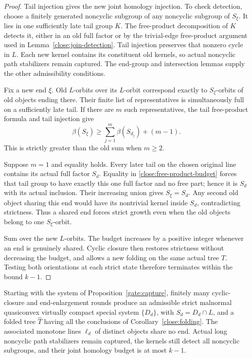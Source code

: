 \begin{proof}
Tail injection gives the new joint homology injection. To check
detection, choose a finitely generated noncyclic subgroup of any
noncyclic subgroup of $S_\xi$. It lies in one sufficiently late
tail group $K$. The free-product decomposition of $K$ detects it,
either in an old full factor or by the trivial-edge free-product
argument used in Lemma~\ref{close:join-detection}. Tail injection
preserves that nonzero cycle in $L$. Each new kernel contains its
constituent old kernels, so actual noncyclic path stabilizers remain
captured. The end-group and intersection lemmas supply the other
admissibility conditions.

Fix a new end $\xi$. Old $L$-orbits over its $L$-orbit correspond
exactly to $S_\xi$-orbits of old objects ending there. Their finite
list of representatives is simultaneously full on a sufficiently
late tail. If there are $m$ such representatives, the tail
free-product formula and tail injection give
\[
 \beta(S_\xi)\ge
   \sum_{j=1}^m\beta(S_{d_j})+(m-1).
\]
This is strictly greater than the old sum when $m\ge2$.

Suppose $m=1$ and equality holds. Every later tail on the chosen
original line contains its actual full factor $S_d$. Equality in
\eqref{close:free-product-budget} forces that tail group to have
exactly this one full factor and no free part; hence it is $S_d$
with its actual inclusion. Their increasing union gives
$S_\xi=S_d$. Any second old object sharing this end would have its
nontrivial kernel inside $S_d$, contradicting strictness. Thus a
shared end forces strict growth even when the old objects belong
to one $S_\xi$-orbit.

Sum over the new $L$-orbits. The budget increases by a positive
integer whenever an end is genuinely shared. Cyclic closure then
restores strictness without decreasing the budget, and allows a new
folding on the same actual tree $T$. Testing both orientations at
each strict state therefore terminates within the bound $k-1$.
\end{proof}

\begin{theorem}\label{close:terminal-system}
Starting with the system of Proposition~\ref{gate:capture}, finitely
many cyclic-closure and end-enlargement rounds produce an admissible
strict malnormal quasiconvex virtually compact special system
$\{D_d\}$, with $S_d=D_d\cap L$, and a folded tree $\widehat T$ having
all the conclusions of Corollary~\ref{close:folding}. The associated
monotone lines $\ell_d$ of distinct objects share no end. Actual long
noncyclic path stabilizers remain captured, the kernels still detect
all noncyclic subgroups, and their joint homology budget is at most
$k-1$.
\end{theorem}

